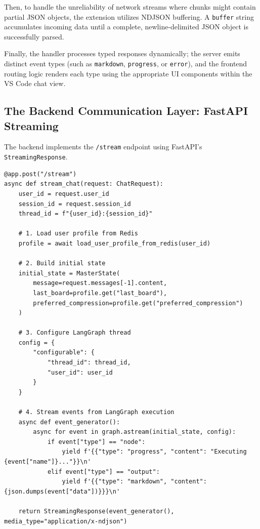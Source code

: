 Then, to handle the unreliability of network streams where chunks might contain partial JSON objects, the extension utilizes NDJSON buffering. A \texttt{buffer} string accumulates incoming data until a complete, newline-delimited JSON object is successfully parsed.

Finally, the handler processes typed responses dynamically; the server emits distinct event types (such as \texttt{markdown}, \texttt{progress}, or \texttt{error}), and the frontend routing logic renders each type using the appropriate UI components within the VS Code chat view.

\subsection{The Backend Communication Layer: FastAPI Streaming}

The backend implements the \texttt{/stream} endpoint using FastAPI's \texttt{StreamingResponse}.

\begin{lstlisting}[caption={FastAPI streaming endpoint in server.py}, label={lst:server_streaming}]
@app.post("/stream")
async def stream_chat(request: ChatRequest):
    user_id = request.user_id
    session_id = request.session_id
    thread_id = f"{user_id}:{session_id}"
    
    # 1. Load user profile from Redis
    profile = await load_user_profile_from_redis(user_id)
    
    # 2. Build initial state
    initial_state = MasterState(
        message=request.messages[-1].content,
        last_board=profile.get("last_board"),
        preferred_compression=profile.get("preferred_compression")
    )
    
    # 3. Configure LangGraph thread
    config = {
        "configurable": {
            "thread_id": thread_id,
            "user_id": user_id
        }
    }
    
    # 4. Stream events from LangGraph execution
    async def event_generator():
        async for event in graph.astream(initial_state, config):
            if event["type"] == "node":
                yield f'{{"type": "progress", "content": "Executing {event["name"]}..."}}\n'
            elif event["type"] == "output":
                yield f'{{"type": "markdown", "content": {json.dumps(event["data"])}}}\n'
    
    return StreamingResponse(event_generator(), media_type="application/x-ndjson")
\end{lstlisting}

